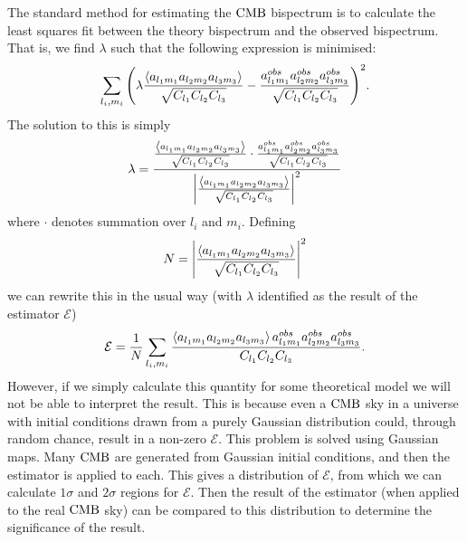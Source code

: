     The standard method for estimating the $\text{CMB}$ bispectrum is to calculate the least squares
    fit between the theory bispectrum and the observed bispectrum. That is, we find $\lambda$
    such that the following expression is minimised:
    \begin{align}
        \sum_{l_i,m_i}{\left(\lambda\frac{\left<a_{l_1m_1}a_{l_2m_2}a_{l_3m_3}\right>}{\sqrt{C_{l_1}C_{l_2}C_{l_3}}}
                - \frac{a^{obs}_{l_1m_1}a^{obs}_{l_2m_2}a^{obs}_{l_3m_3}}{\sqrt{C_{l_1}C_{l_2}C_{l_3}}}\right)}^2.
    \end{align}
    The solution to this is simply
    \begin{align}
        \lambda = \frac{\frac{\left<a_{l_1m_1}a_{l_2m_2}a_{l_3m_3}\right>}{\sqrt{C_{l_1}C_{l_2}C_{l_3}}}\cdot\frac{a^{obs}_{l_1m_1}a^{obs}_{l_2m_2}a^{obs}_{l_3m_3}}{\sqrt{C_{l_1}C_{l_2}C_{l_3}}}}{\left|\frac{\left<a_{l_1m_1}a_{l_2m_2}a_{l_3m_3}\right>}{\sqrt{C_{l_1}C_{l_2}C_{l_3}}}\right|^2}
    \end{align}
    where $\cdot$ denotes summation over $l_i$ and $m_i$.
    Defining
    \begin{align}
        N = \left|\frac{\left<a_{l_1m_1}a_{l_2m_2}a_{l_3m_3}\right>}{\sqrt{C_{l_1}C_{l_2}C_{l_3}}}\right|^2
    \end{align}
    we can rewrite this in the usual way (with $\lambda$ identified as the result of the estimator $\mathcal{E}$)
    \begin{align}
        \mathcal{E} = \frac{1}{N}\sum_{l_i,m_i}\frac{\left<a_{l_1m_1}a_{l_2m_2}a_{l_3m_3}\right>a^{obs}_{l_1m_1}a^{obs}_{l_2m_2}a^{obs}_{l_3m_3}}{C_{l_1}C_{l_2}C_{l_3}}.
    \end{align}
    However, if we simply calculate this quantity for some theoretical model we will not be able to
    interpret the result. This is because even a $\text{CMB}$ sky in a universe with initial conditions
    drawn from a purely Gaussian distribution could, through random chance,
    result in a non-zero $\mathcal{E}$. This problem is solved using Gaussian maps.
    Many $\text{CMB}$ are generated from Gaussian initial conditions, and then the estimator
    is applied to each. This gives a distribution of $\mathcal{E}$, from which we can
    calculate $1\sigma$ and $2\sigma$ regions for $\mathcal{E}$. Then the result of the
    estimator (when applied to the real $\text{CMB}$ sky) can be compared to this distribution
    to determine the significance of the result.


